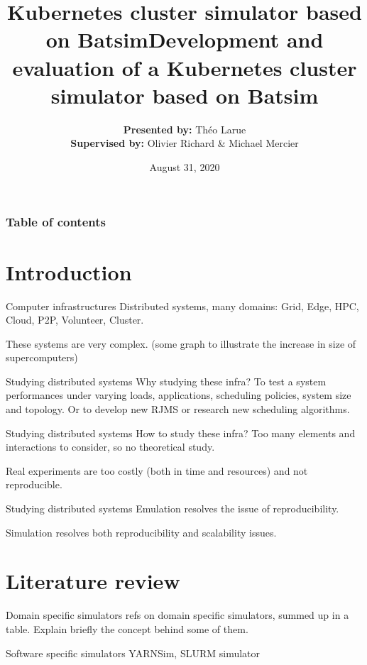 \documentclass[12pt, aspectratio=43]{beamer}
\title{Kubernetes cluster simulator based on Batsim}
\title{Development and evaluation of a Kubernetes cluster simulator based on
Batsim}
\author{\textbf{Presented by:} Théo Larue\\\textbf{Supervised by:} Olivier
Richard \& Michael Mercier}
\date{August 31, 2020}
\institute[Théo LARUE]{Université Grenoble Alpes}
\begin{document}
\frame{\titlepage}

\begin{frame}\frametitle{Table of contents}\tableofcontents
\end{frame}

\section{Introduction}
\begin{frame}{Computer infrastructures}
	Distributed systems, many domains: Grid, Edge, HPC, Cloud, P2P, Volunteer, Cluster. 

	These systems are very complex. (some graph to illustrate the
	increase in size of supercomputers)
\end{frame}

\begin{frame}{Studying distributed systems}
	Why studying these infra? To test a system performances under varying
	loads, applications, scheduling policies, system size and topology. Or
	to develop new RJMS or research new scheduling algorithms.
\end{frame}

\begin{frame}{Studying distributed systems}
	How to study these infra? Too many elements and interactions to
	consider, so no theoretical study. 

	Real experiments are too costly (both in time and resources) and not
	reproducible.
\end{frame}

\begin{frame}{Studying distributed systems}
	Emulation resolves the issue of reproducibility.

	Simulation resolves both reproducibility and scalability
	issues.
\end{frame}

\section{Literature review}
\begin{frame}{Domain specific simulators}
	refs on domain specific simulators, summed up in a table. Explain
	briefly the concept behind some of them.
\end{frame}

\begin{frame}{Software specific simulators}
	YARNSim, SLURM simulator
\end{frame}
\end{document}
